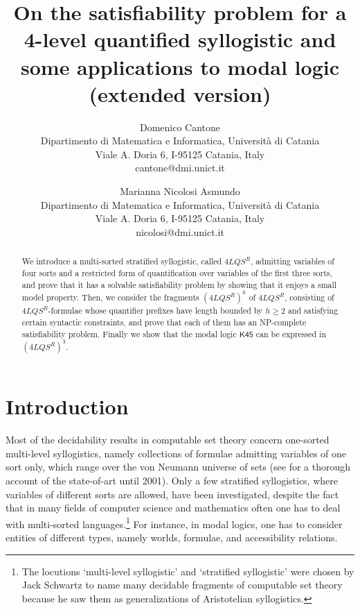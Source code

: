 \documentclass{fundam}
\newcommand{\Kqc}{\mathsf{K45}}
\newcommand{\QLQSR}{\ensuremath{\mbox{$4\mathit{LQS}^{R}$}}\xspace}
\begin{document}
\title{On the satisfiability problem for a 4-level quantified syllogistic and some applications to modal logic (extended version)}

\author{Domenico Cantone \\
Dipartimento di Matematica e Informatica, Universit\`a di
Catania\\
      Viale A. Doria 6, I-95125 Catania, Italy \\
cantone@dmi.unict.it\\
\and Marianna Nicolosi Asmundo \\
Dipartimento di Matematica e Informatica, Universit\`a di
Catania\\
      Viale A. Doria 6, I-95125 Catania, Italy \\
      nicolosi@dmi.unict.it}
\maketitle




\begin{abstract}
We introduce a multi-sorted stratified syllogistic, called $\QLQSR$,
admitting variables of four sorts and a restricted form of
quantification over variables of the first three sorts, and prove that
it has a solvable satisfiability problem by showing that it enjoys a
small model property.  Then, we consider the fragments $(\QLQSR)^h$ of
$\QLQSR$, consisting of $\QLQSR$-formulae whose quantifier prefixes
have length bounded by $h \geq 2$ and satisfying certain syntactic
constraints, and prove that each of them has an \textsf{NP}-complete
satisfiability problem.  Finally we show that the modal logic $\Kqc$
can be expressed in $(\QLQSR)^3$.
\end{abstract}

\section{Introduction}
Most of the decidability results in computable set theory concern
one-sorted multi-level syllogistics, namely collections of formulae
admitting variables of one sort only, which range over the von Neumann
universe of sets (see \cite{CFO89,COO01} for a thorough account of the
state-of-art until 2001).
Only a few stratified syllogistics, where
variables of different sorts are allowed, have been investigated,
despite the fact that in many fields of computer science and
mathematics often one has to deal with multi-sorted languages.\footnote{The locutions `multi-level syllogistic' and `stratified syllogistic' were chosen by Jack Schwartz to
name many decidable fragments of computable set theory because he saw them as generalizations of Aristotelian syllogistics.}
For instance, in modal logics, one has to consider entities of different
types, namely worlds, formulae, and accessibility relations.
\end{document}
